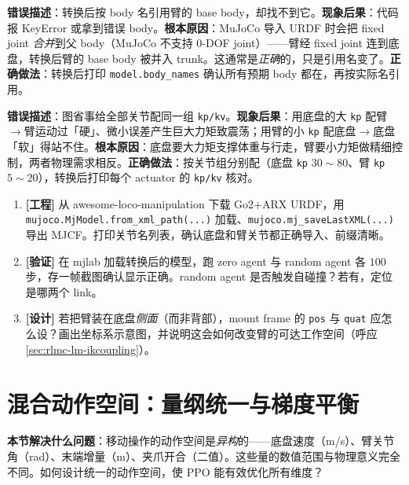 \begin{pitfall}
\textbf{错误描述}：转换后按 body 名引用臂的 base body，却找不到它。\textbf{现象后果}：代码报 KeyError 或拿到错误 body。\textbf{根本原因}：MuJoCo 导入 URDF 时会把 fixed joint \emph{合并}到父 body（MuJoCo 不支持 0-DOF joint）——臂经 fixed joint 连到底盘，转换后臂的 base body 被并入 trunk。这通常是\emph{正确}的，只是引用名变了。\textbf{正确做法}：转换后打印 \verb|model.body_names| 确认所有预期 body 都在，再按实际名引用。
\end{pitfall}

\begin{pitfall}
\textbf{错误描述}：图省事给全部关节配同一组 \verb|kp/kv|。\textbf{现象后果}：用底盘的大 \verb|kp| 配臂$\to$臂运动过「硬」、微小误差产生巨大力矩致震荡；用臂的小 \verb|kp| 配底盘$\to$底盘「软」得站不住。\textbf{根本原因}：底盘要大力矩支撑体重与行走，臂要小力矩做精细控制，两者物理需求相反。\textbf{正确做法}：按关节组分别配（底盘 \verb|kp| $30\!\sim\!80$、臂 \verb|kp| $5\!\sim\!20$），转换后打印每个 actuator 的 \verb|kp/kv| 核对。
\end{pitfall}

\begin{practice}[练习·复合建模]
\begin{enumerate}
\item \textbf{[工程]} 从 awesome-loco-manipulation 下载 Go2+ARX URDF，用 \verb|mujoco.MjModel.from_xml_path(...)| 加载、\verb|mujoco.mj_saveLastXML(...)| 导出 MJCF。打印关节名列表，确认底盘和臂关节都正确导入、前缀清晰。
\item \textbf{[验证]} 在 mjlab 加载转换后的模型，跑 zero agent 与 random agent 各 $100$ 步，存一帧截图确认显示正确。random agent 是否触发自碰撞？若有，定位是哪两个 link。
\item \textbf{[设计]} 若把臂装在底盘\emph{侧面}（而非背部），mount frame 的 \verb|pos| 与 \verb|quat| 应怎么设？画出坐标系示意图，并说明这会如何改变臂的可达工作空间（呼应 \cref{sec:rlmc-lm-ikcoupling}）。
\end{enumerate}
\end{practice}

\section{混合动作空间：量纲统一与梯度平衡}
\label{sec:rlmc-lm-action}

\textbf{本节解决什么问题}：移动操作的动作空间是\emph{异构}的——底盘速度（m/s）、臂关节角（rad）、末端增量（m）、夹爪开合（二值）。这些量的数值范围与物理意义完全不同。如何设计统一的动作空间，使 PPO 能有效优化所有维度？

